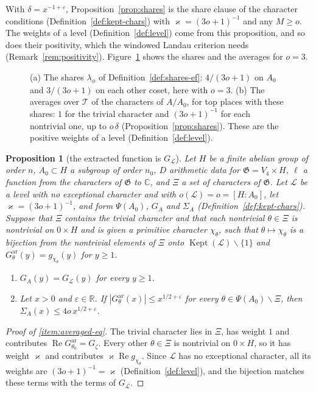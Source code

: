 \documentclass[11pt]{amsbook}
\theoremstyle{plain}
\newtheorem{proposition}[theorem]{Proposition}
\theoremstyle{definition}
\theoremstyle{remark}
\numberwithin{equation}{section}
\numberwithin{figure}{chapter}
\numberwithin{table}{chapter}
\newcommand{\R}{\mathbb{R}}
\renewcommand{\C}{\mathbb{C}}
\newcommand{\eps}{\varepsilon}
\newcommand{\lev}{\mathscr{L}}
\newcommand{\Gz}{G_{\zeta}}
\newcommand{\Kept}{\operatorname{Kept}}
\newcommand{\GG}{\mathfrak{G}}
\newcommand{\GPsi}{G^{\mathrm{ar}}}
\newcommand{\Top}{\mathcal{T}}
\begin{document}
\noindent With $\delta=x^{-1+\eps}$, Proposition~\ref{prop:shares} is
the share clause of the character conditions
(Definition~\ref{def:kept-chars}) with $\varkappa=(3o+1)^{-1}$ and any
$M\ge o$. The weights of a level (Definition~\ref{def:level}) come
from this proposition, and so does their positivity, which the
windowed Landau criterion needs (Remark~\ref{rem:positivity}).
Figure~\ref{fig:shares} shows the shares
and the averages for $o=3$.

\begin{figure}[htbp]
\centering

\caption{(a) The shares $\lambda_\phi$ of
Definition~\ref{def:shares-ef}: $4/(3o+1)$ on $A_0$ and $3/(3o+1)$ on
each other coset, here with $o=3$. (b) The averages over $\Top$ of the
characters of $A/A_0$, for top places with these shares: $1$ for the
trivial character and $(3o+1)^{-1}$ for each nontrivial one, up to
$o\,\delta$ (Proposition~\ref{prop:shares}). These are the positive
weights of a level (Definition~\ref{def:level}).}
\label{fig:shares}
\end{figure}

\begin{proposition}[the extracted function is $G_\lev$]
\label{prop:averaged}
Let $H$ be a finite abelian group of order $n$, $A_0\subset H$ a
subgroup of order $n_0$, $D$ arithmetic data for $\GG=V_4\times H$,
$\ell$ a function from the characters of $\GG$ to $\C$, and $\Xi$ a set
of characters of $\GG$. Let $\lev$ be a level with no exceptional
character and with $o(\lev)=o=[H:A_0]$, let $\varkappa=(3o+1)^{-1}$, and form
$\Psi(A_0)$, $G_A$ and $\Sigma_A$ (Definition~\ref{def:kept-chars}).
Suppose that $\Xi$ contains the trivial character and that each
nontrivial $\theta\in\Xi$ is nontrivial on $0\times H$ and is given a
primitive character $\chi_\theta$, such that $\theta\mapsto\chi_\theta$
is a bijection from the nontrivial elements of $\Xi$ onto
$\Kept(\lev)\smallsetminus\{1\}$ and $\GPsi_\theta(y)=
g_{\chi_\theta}(y)$ for $y\ge1$.
\begin{enumerate}[label=(\alph*)]
\item\label{item:averaged-eq} $G_A(y)=G_\lev(y)$ for every $y\ge1$.
\item\label{item:averaged-rest} Let $x>0$ and $\eps\in\R$. If
$|\GPsi_\theta(x)|\le x^{1/2+\eps}$ for every
$\theta\in\Psi(A_0)\smallsetminus\Xi$, then
$\Sigma_A(x)\le4o\,x^{1/2+\eps}$.
\end{enumerate}
\end{proposition}

\begin{proof}[Proof of \ref{item:averaged-eq}]
The trivial character lies in $\Xi$, has weight $1$ and contributes
$\operatorname{Re}\GPsi_{\theta_0}=\Gz$. Every other
$\theta\in\Xi$ is nontrivial on $0\times H$, so it has weight $\varkappa$ and
contributes $\varkappa\operatorname{Re}g_{\chi_\theta}$. Since $\lev$ has no
exceptional character, all its weights are $(3o+1)^{-1}=\varkappa$
(Definition~\ref{def:level}), and the bijection matches these terms
with the terms of $G_\lev$.
\end{proof}
\end{document}
